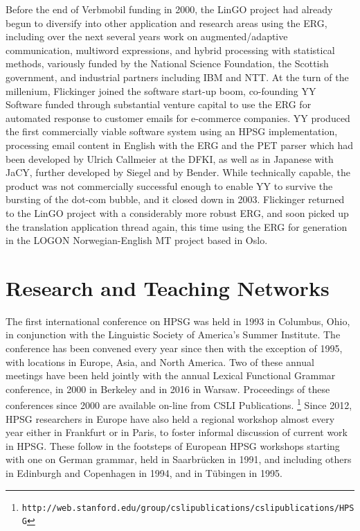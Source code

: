 \documentclass[output=paper]{langsci/langscibook}
\begin{document}
Before the end of Verbmobil funding in 2000, the LinGO project had already begun to diversify into other application and research areas using the ERG, including over the next several years work on augmented/adaptive communication, multiword expressions, and hybrid processing with statistical methods, variously funded by the National Science Foundation, the Scottish government, and industrial partners including IBM and NTT.  At the turn of the millenium, Flickinger joined the software start-up boom, co-founding YY Software funded through substantial venture capital to use the ERG for automated response to customer emails for e-commerce companies.  YY produced the first commercially viable software system using an HPSG implementation, processing email content in English with the ERG and the PET parser \citep{callmeier00} which had been developed by Ulrich Callmeier at the DFKI, as well as in Japanese with JaCY, further developed by Siegel and by Bender.  While technically capable, the product was not commercially successful enough to enable YY to survive the bursting of the dot-com bubble, and it closed down in 2003.  Flickinger returned to the LinGO project with a considerably more robust ERG, and soon picked up the translation application thread again, this time using the ERG for generation in the LOGON Norwegian-English MT project based in Oslo.


\section{Research and Teaching Networks}

The first international conference on HPSG was held in 1993 in Columbus, Ohio, in conjunction with the Linguistic Society of America's Summer Institute.  The conference has been convened every year since then with the exception of 1995, with locations in Europe, Asia, and North America.  Two of these annual meetings have been held jointly with the annual Lexical Functional Grammar conference, in 2000 in Berkeley and in 2016 in Warsaw.  Proceedings of these conferences since 2000 are available on-line from CSLI Publications. \footnote{\tt http://web.stanford.edu/group/cslipublications/cslipublications/HPSG}  Since 2012, HPSG researchers in Europe have also held a regional workshop almost every year either in Frankfurt or in Paris, to foster informal discussion of current work in HPSG.  These follow in the footsteps of European HPSG workshops starting with one on German grammar, held in Saarbr{\"u}cken in 1991, and including others in Edinburgh and Copenhagen in 1994, and in T{\"u}bingen in 1995.
\end{document}
